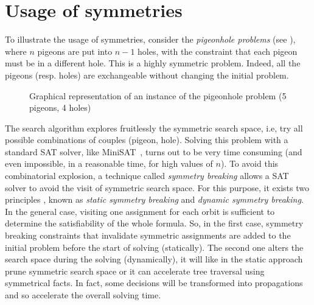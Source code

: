 \section{Usage of symmetries}

To illustrate the usage of symmetries, consider the \textit{pigeonhole problems} (see ), where $n$ pigeons are put into $n-1$ holes, with the constraint that each pigeon must be in a different hole. This is a
highly symmetric problem. Indeed, all the pigeons (resp. holes) are exchangeable
without changing the initial problem.
\begin{figure}[!htbp]
 \centering
 \caption{Graphical representation of an instance of the pigeonhole problem (5 pigeons, 4 holes)}
 \label{fig:hole}
\end{figure}
The search algorithm explores
fruitlessly the symmetric search space, i.e, try all possible combinations of couples (pigeon, hole).
Solving this problem with a standard SAT solver, like MiniSAT~\cite{een2003extensible},
 turns out to be very time consuming (and even impossible, in a reasonable time, for high values of $n$). 
To avoid this combinatorial explosion, a technique called \emph{symmetry breaking} allows a SAT solver to avoid the visit of symmetric search space. For this purpose, it exists two principles , known as \emph{static symmetry breaking}
and \emph{dynamic symmetry breaking}. In the general case, visiting one assignment for each orbit is sufficient to determine the satisfiability of the whole formula.
So, in the first case, symmetry breaking constraints that invalidate symmetric assignments are added to the initial problem before the start of solving (statically). The second one alters
the search space during the solving (dynamically), it will like in the static approach prune symmetric search space or it can accelerate tree traversal using symmetrical facts.
In fact, some decisions will be transformed into propagations and so accelerate the overall solving time.
  
